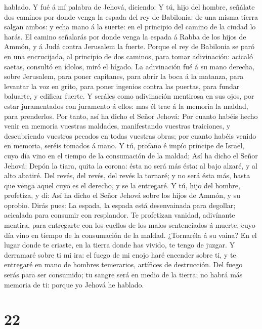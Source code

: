 hablado.  Y fué á mí palabra de Jehová, diciendo:
 Y tú, hijo del hombre, señálate dos caminos por donde
venga la espada del rey de Babilonia: de una misma tierra salgan ambos:
y echa mano á la suerte: en el principio del camino de la ciudad lo
harás.  El camino señalarás por donde venga la espada á
Rabba de los hijos de Ammón, y á Judá contra Jerusalem la fuerte.
 Porque el rey de Babilonia se paró en una encrucijada, al
principio de dos caminos, para tomar adivinación: acicaló saetas,
consultó en ídolos, miró el hígado.  La adivinación fué á
su mano derecha, sobre Jerusalem, para poner capitanes, para abrir la
boca á la matanza, para levantar la voz en grito, para poner ingenios
contra las puertas, para fundar baluarte, y edificar fuerte.
 Y seráles como adivinación mentirosa en sus ojos, por
estar juramentados con juramento á ellos: mas él trae á la memoria la
maldad, para prenderlos.  Por tanto, así ha dicho el Señor
Jehová: Por cuanto habéis hecho venir en memoria vuestras maldades,
manifestando vuestras traiciones, y descubriendo vuestros pecados en
todas vuestras obras; por cuanto habéis venido en memoria, seréis
tomados á mano.  Y tú, profano é impío príncipe de Israel,
cuyo día vino en el tiempo de la consumación de la maldad; 
Así ha dicho el Señor Jehová: Depón la tiara, quita la corona: ésta no
será más ésta: al bajo alzaré, y al alto abatiré.  Del
revés, del revés, del revés la tornaré; y no será ésta más, hasta que
venga aquel cuyo es el derecho, y se la entregaré.  Y tú,
hijo del hombre, profetiza, y di: Así ha dicho el Señor Jehová sobre los
hijos de Ammón, y su oprobio. Dirás pues: La espada, la espada está
desenvainada para degollar; acicalada para consumir con resplandor.
 Te profetizan vanidad, adivínante mentira, para entregarte
con los cuellos de los malos sentenciados á muerte, cuyo día vino en
tiempo de la consumación de la maldad.  ¿Tornaréla á su
vaina? En el lugar donde te criaste, en la tierra donde has vivido, te
tengo de juzgar.  Y derramaré sobre ti mi ira: el fuego de
mi enojo haré encender sobre ti, y te entregaré en mano de hombres
temerarios, artífices de destrucción.  Del fuego serás para
ser consumido; tu sangre será en medio de la tierra; no habrá más
memoria de ti: porque yo Jehová he hablado.

\hypertarget{section-21}{%
\section{22}\label{section-21}}

